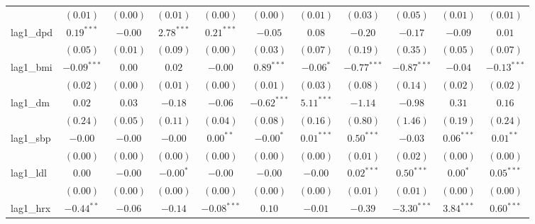 \begin{tabular}{l c c c c c c c c c c}
                 & $(0.01)$      & $(0.00)$      & $(0.01)$      & $(0.00)$      & $(0.00)$      & $(0.01)$       & $(0.03)$      & $(0.05)$       & $(0.01)$       & $(0.01)$      \\
lag1\_dpd        & $0.19^{***}$  & $-0.00$       & $2.78^{***}$  & $0.21^{***}$  & $-0.05$       & $0.08$         & $-0.20$       & $-0.17$        & $-0.09$        & $0.01$        \\
                 & $(0.05)$      & $(0.01)$      & $(0.09)$      & $(0.00)$      & $(0.03)$      & $(0.07)$       & $(0.19)$      & $(0.35)$       & $(0.05)$       & $(0.07)$      \\
lag1\_bmi        & $-0.09^{***}$ & $0.00$        & $0.02$        & $-0.00$       & $0.89^{***}$  & $-0.06^{*}$    & $-0.77^{***}$ & $-0.87^{***}$  & $-0.04$        & $-0.13^{***}$ \\
                 & $(0.02)$      & $(0.00)$      & $(0.01)$      & $(0.00)$      & $(0.01)$      & $(0.03)$       & $(0.08)$      & $(0.14)$       & $(0.02)$       & $(0.02)$      \\
lag1\_dm         & $0.02$        & $0.03$        & $-0.18$       & $-0.06$       & $-0.62^{***}$ & $5.11^{***}$   & $-1.14$       & $-0.98$        & $0.31$         & $0.16$        \\
                 & $(0.24)$      & $(0.05)$      & $(0.11)$      & $(0.04)$      & $(0.08)$      & $(0.16)$       & $(0.80)$      & $(1.46)$       & $(0.19)$       & $(0.24)$      \\
lag1\_sbp        & $-0.00$       & $-0.00$       & $-0.00$       & $0.00^{**}$   & $-0.00^{*}$   & $0.01^{***}$   & $0.50^{***}$  & $-0.03$        & $0.06^{***}$   & $0.01^{**}$   \\
                 & $(0.00)$      & $(0.00)$      & $(0.00)$      & $(0.00)$      & $(0.00)$      & $(0.00)$       & $(0.01)$      & $(0.02)$       & $(0.00)$       & $(0.00)$      \\
lag1\_ldl        & $0.00$        & $-0.00$       & $-0.00^{*}$   & $-0.00$       & $-0.00$       & $-0.00$        & $0.02^{***}$  & $0.50^{***}$   & $0.00^{*}$     & $0.05^{***}$  \\
                 & $(0.00)$      & $(0.00)$      & $(0.00)$      & $(0.00)$      & $(0.00)$      & $(0.00)$       & $(0.01)$      & $(0.01)$       & $(0.00)$       & $(0.00)$      \\
lag1\_hrx        & $-0.44^{**}$  & $-0.06$       & $-0.14$       & $-0.08^{***}$ & $0.10$        & $-0.01$        & $-0.39$       & $-3.30^{***}$  & $3.84^{***}$   & $0.60^{***}$  \\

\end{tabular}

